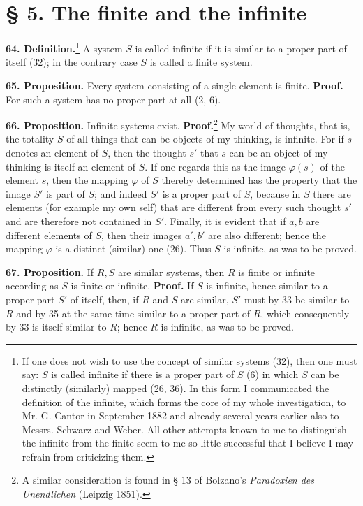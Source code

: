 \documentclass[11pt]{article}
\begin{document}
\section*{§ 5. The finite and the infinite}

\noindent\textbf{64. Definition.}\footnote{If one does not wish to use the concept of similar systems (32), then one must say: $S$ is called infinite if there is a proper part of $S$ (6) in which $S$ can be distinctly (similarly) mapped (26, 36). In this form I communicated the definition of the infinite, which forms the core of my whole investigation, to Mr. G. Cantor in September 1882 and already several years earlier also to Messrs. Schwarz and Weber. All other attempts known to me to distinguish the infinite from the finite seem to me so little successful that I believe I may refrain from criticizing them.} A system $S$ is called infinite if it is similar to a proper part of itself (32); in the contrary case $S$ is called a finite system.

\noindent\textbf{65. Proposition.} Every system consisting of a single element is finite. \textbf{Proof.} For such a system has no proper part at all (2, 6).

\noindent\textbf{66. Proposition.} Infinite systems exist. \textbf{Proof.}\footnote{A similar consideration is found in § 13 of Bolzano's \emph{Paradoxien des Unendlichen} (Leipzig 1851).} My world of thoughts, that is, the totality $S$ of all things that can be objects of my thinking, is infinite. For if $s$ denotes an element of $S$, then the thought $s'$ that $s$ can be an object of my thinking is itself an element of $S$. If one regards this as the image $\varphi(s)$ of the element $s$, then the mapping $\varphi$ of $S$ thereby determined has the property that the image $S'$ is part of $S$; and indeed $S'$ is a proper part of $S$, because in $S$ there are elements (for example my own self) that are different from every such thought $s'$ and are therefore not contained in $S'$. Finally, it is evident that if $a,b$ are different elements of $S$, then their images $a',b'$ are also different; hence the mapping $\varphi$ is a distinct (similar) one (26). Thus $S$ is infinite, as was to be proved.

\noindent\textbf{67. Proposition.} If $R,S$ are similar systems, then $R$ is finite or infinite according as $S$ is finite or infinite. \textbf{Proof.} If $S$ is infinite, hence similar to a proper part $S'$ of itself, then, if $R$ and $S$ are similar, $S'$ must by 33 be similar to $R$ and by 35 at the same time similar to a proper part of $R$, which consequently by 33 is itself similar to $R$; hence $R$ is infinite, as was to be proved.
\end{document}
